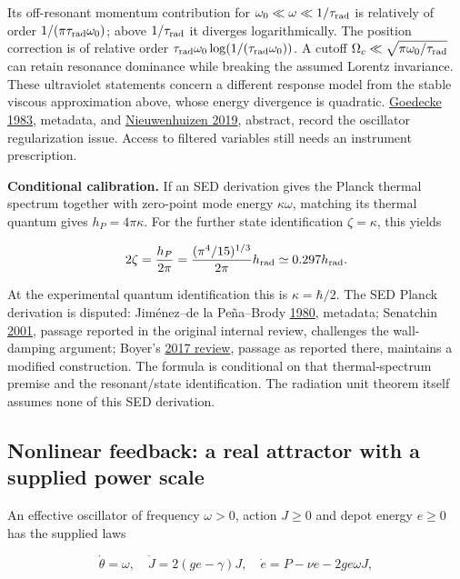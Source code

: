 \documentclass[11pt,a4paper]{article}
\begin{document}
Its off-resonant momentum contribution for
\(\omega_0\ll\omega\ll1/\tau_{\rm rad}\) is relatively of order
\(1/(\pi\tau_{\rm rad}\omega_0)\); above \(1/\tau_{\rm rad}\) it
diverges logarithmically. The position correction is of relative order
\(\tau_{\rm rad}\omega_0\log(1/(\tau_{\rm rad}\omega_0))\). A cutoff
\(\Omega_c\ll\sqrt{\pi\omega_0/\tau_{\rm rad}}\) can retain resonance
dominance while breaking the assumed Lorentz invariance. These
ultraviolet statements concern a different response model from the
stable viscous approximation above, whose energy divergence is
quadratic. \href{https://doi.org/10.1007/BF00728140}{Goedecke 1983},
metadata, and \href{https://doi.org/10.3390/atoms7020059}{Nieuwenhuizen
2019}, abstract, record the oscillator regularization issue. Access to
filtered variables still needs an instrument prescription.

\textbf{Conditional calibration.} If an SED derivation gives the Planck
thermal spectrum together with zero-point mode energy \(\kappa\omega\),
matching its thermal quantum gives \(h_P=4\pi\kappa\). For the further
state identification \(\zeta=\kappa\), this yields

\[2\zeta=\frac{h_P}{2\pi}
 =\frac{(\pi^4/15)^{1/3}}{2\pi}h_{\rm rad}\simeq0.297h_{\rm rad}.\]

At the experimental quantum identification this is \(\kappa=\hbar/2\).
The SED Planck derivation is disputed: Jiménez--de la Peña--Brody
\href{https://doi.org/10.1119/1.12221}{1980}, metadata; Senatchin
\href{https://arxiv.org/abs/physics/0105054}{2001}, passage reported in
the original internal review, challenges the wall-damping argument;
Boyer's \href{https://arxiv.org/abs/1711.04179}{2017 review}, passage as
reported there, maintains a modified construction. The formula is
conditional on that thermal-spectrum premise and the resonant/state
identification. The radiation unit theorem itself assumes none of this
SED derivation.

\hypertarget{nonlinear-feedback-a-real-attractor-with-a-supplied-power-scale}{%
\subsection{Nonlinear feedback: a real attractor with a supplied power
scale}\label{nonlinear-feedback-a-real-attractor-with-a-supplied-power-scale}}

An effective oscillator of frequency \(\omega>0\), action \(J\ge0\) and
depot energy \(e\ge0\) has the supplied laws

\[\dot\theta=\omega,\quad\dot J=2(ge-\gamma)J,\quad
\dot e=P-\nu e-2ge\omega J,\]
\end{document}
